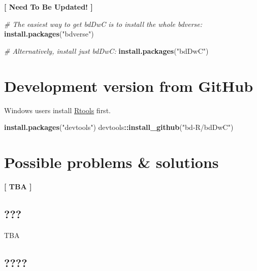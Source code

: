 \documentclass[]{book}
\newenvironment{Shaded}{\begin{snugshade}}{\end{snugshade}}
\newcommand{\KeywordTok}[1]{\textcolor[rgb]{0.13,0.29,0.53}{\textbf{#1}}}
\newcommand{\StringTok}[1]{\textcolor[rgb]{0.31,0.60,0.02}{#1}}
\newcommand{\CommentTok}[1]{\textcolor[rgb]{0.56,0.35,0.01}{\textit{#1}}}
\newcommand{\OperatorTok}[1]{\textcolor[rgb]{0.81,0.36,0.00}{\textbf{#1}}}
\newcommand{\NormalTok}[1]{#1}
\theoremstyle{definition}
\theoremstyle{definition}
\theoremstyle{definition}
\theoremstyle{remark}
\begin{document}
\textbf{{{[} Need To Be Updated! {]}}}

\begin{Shaded}
\begin{Highlighting}[]
\CommentTok{# The easiest way to get bdDwC is to install the whole bdverse:}
\KeywordTok{install.packages}\NormalTok{(}\StringTok{"bdverse"}\NormalTok{)}
\end{Highlighting}
\end{Shaded}

\begin{Shaded}
\begin{Highlighting}[]
\CommentTok{# Alternatively, install just bdDwC:}
\KeywordTok{install.packages}\NormalTok{(}\StringTok{"bdDwC"}\NormalTok{)}
\end{Highlighting}
\end{Shaded}

\section{Development version from
GitHub}\label{development-version-from-github}

Windows users install
\href{https://cran.r-project.org/bin/windows/Rtools/}{Rtools} first.

\begin{Shaded}
\begin{Highlighting}[]
\KeywordTok{install.packages}\NormalTok{(}\StringTok{"devtools"}\NormalTok{)}
\NormalTok{devtools}\OperatorTok{::}\KeywordTok{install_github}\NormalTok{(}\StringTok{"bd-R/bdDwC"}\NormalTok{)}
\end{Highlighting}
\end{Shaded}

\section{Possible problems \&
solutions}\label{possible-problems-solutions}

\textbf{{{[} TBA {]}}}

\subsection{???}\label{section}

TBA

\subsection{????}\label{section-1}
\end{document}
